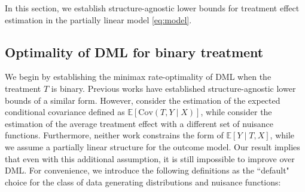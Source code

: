 \documentclass{article}
\newcommand{\E}{\mathbb{E}}
\begin{document}
In this section, we establish structure-agnostic lower bounds for treatment effect estimation in the partially linear model \cref{eq:model}.
%
%
\subsection{Optimality of DML for binary treatment}
\label{sec:binary-lower-bound}

%

We begin by establishing the minimax rate-optimality of DML when the treatment $T$ is binary. %
Previous works \citep{balakrishnan2023fundamental,jin2024structure} have established structure-agnostic lower bounds of a similar form. However, \citet{balakrishnan2023fundamental} consider the estimation of the expected conditional covariance defined as $\E[\mathrm{Cov}(T,Y\mid X)]$, while \citet{jin2024structure} consider the estimation of the average treatment effect with a different set of nuisance functions. Furthermore, neither work constrains the form of $\E[Y\mid T,X]$, while we assume a partially linear structure for the outcome model. Our result implies that even with this additional assumption, it is still impossible to improve over DML. For convenience, we introduce the following definitions as the ``default" choice for the class of data generating distributions and nuisance functions:
\end{document}
